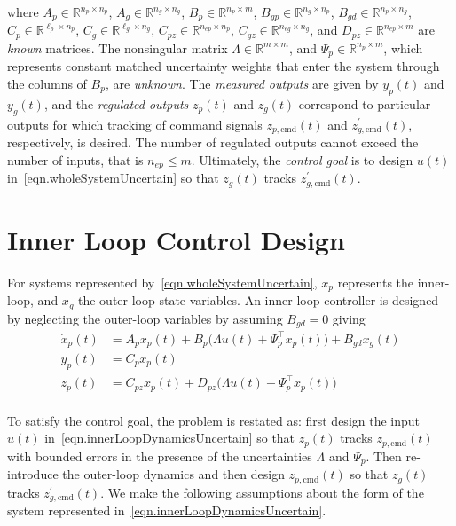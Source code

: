 \documentclass[journal]{IEEEtran}
\theoremstyle{innercustomthm}
\begin{document}
  where $A_{p}\in\mathbb{R}^{n_{p}\times n_{p}}$, $A_{g}\in\mathbb{R}^{n_{g}\times n_{g}}$, $B_{p}\in\mathbb{R}^{n_{p}\times m}$, $B_{gp}\in\mathbb{R}^{n_{g}\times n_{p}}$, $B_{gd}\in\mathbb{R}^{n_{p}\times n_{g}}$, $C_{p}\in\mathbb{R}^{\ell_{p} \times n_{p}}$, $C_{g}\in\mathbb{R}^{\ell_{g}\times n_{g}}$, $C_{pz}\in\mathbb{R}^{n_{ep}\times n_{p}}$, $C_{gz}\in\mathbb{R}^{n_{eg}\times n_{g}}$, and $D_{pz}\in\mathbb{R}^{n_{ep}\times m}$ are \textit{known} matrices.
  The nonsingular matrix $\Lambda\in\mathbb{R}^{m\times m}$, and $\Psi_{p}\in\mathbb{R}^{n_{p}\times m}$, which represents constant matched uncertainty weights that enter the system through the columns of $B_{p}$, are \textit{unknown}.
  The \textit{measured outputs} are given by $y_{p}(t)$ and $y_{g}(t)$, and the \textit{regulated outputs} $z_{p}(t)$ and $z_{g}(t)$ correspond to particular outputs for which tracking of command signals $z_{p,\text{cmd}}(t)$ and $z_{g,\text{cmd}}^{\prime}(t)$, respectively, is desired.
  The number of regulated outputs cannot exceed the number of inputs, that is $n_{ep}\leq m$.
  Ultimately, the \textit{control goal} is to design $u(t)$ in\ \eqref{eqn.wholeSystemUncertain} so that $z_{g}(t)$ tracks $z_{g,\text{cmd}}^{\prime}(t)$.

  \section{Inner Loop Control Design}\label{sec.InnerLoopControlDesign}

  For systems represented by\ \eqref{eqn.wholeSystemUncertain}, $x_{p}$ represents the inner-loop, and $x_{g}$ the outer-loop state variables.
  An inner-loop controller is designed by neglecting the outer-loop variables by assuming $B_{gd}=0$ giving
  {%
    \small
    \setlength{\belowdisplayskip}{-8pt}
    \begin{align}
      \label{eqn.innerLoopDynamicsUncertain}
      \dot{x}_{p}(t) &= A_{p}x_{p}(t) + B_{p}\bigr(\Lambda u(t) + \Psi_{p}^{\top}x_{p}(t)\bigr)+B_{gd}x_{g}(t) \nonumber \\
      y_{p}(t) &= C_{p}x_{p}(t) \\
      z_{p}(t) &= C_{pz}x_{p}(t) + D_{pz}\bigr(\Lambda u(t) + \Psi_{p}^{\top}x_{p}(t)\bigr) \nonumber \\ \nonumber
    \end{align}
  }%

  To satisfy the control goal, the problem is restated as: first design the input $u(t)$ in\ \eqref{eqn.innerLoopDynamicsUncertain} so that $z_{p}(t)$ tracks $z_{p,\text{cmd}}(t)$ with bounded errors in the presence of the uncertainties $\Lambda$ and $\Psi_{p}$.
  Then re-introduce the outer-loop dynamics and then design $z_{p,\text{cmd}}(t)$ so that $z_{g}(t)$ tracks $z_{g,\text{cmd}}^{\prime}(t)$.
  We make the following assumptions about the form of the system represented in\ \eqref{eqn.innerLoopDynamicsUncertain}.
\end{document}

